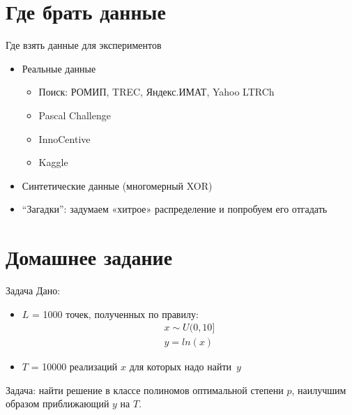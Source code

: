\documentclass[14pt, fleqn, xcolor={dvipsnames, table}]{beamer}
\begin{document}
\section{Где брать данные}
\begin{frame}{Где взять данные для экспериментов}
\begin{itemize}
  \item Реальные данные
  \begin{itemize}
    \item Поиск: РОМИП, TREC, Яндекс.ИМАТ, Yahoo LTRCh
    \item Pascal Challenge
    \item InnoCentive
    \item Kaggle
  \end{itemize}
  \item Синтетические данные (многомерный XOR)
  \item ``Загадки'': задумаем «хитрое» распределение и попробуем его отгадать
\end{itemize}
\end{frame}

\section{Домашнее задание}
\begin{frame}{Задача}
Дано:
\begin{itemize}
  \item $L$ = 1000 точек, полученных по правилу:
$$\begin{array}{l}
x \sim U (0,10] \\
y = ln(x)
\end{array}$$
  \item $T$ = 10000 реализаций $x$ для которых надо найти~$y$
\end{itemize}
Задача: найти решение в классе полиномов оптимальной степени $p$, наилучшим образом приближающий $y$ на $T$.

\end{frame}
\end{document}
